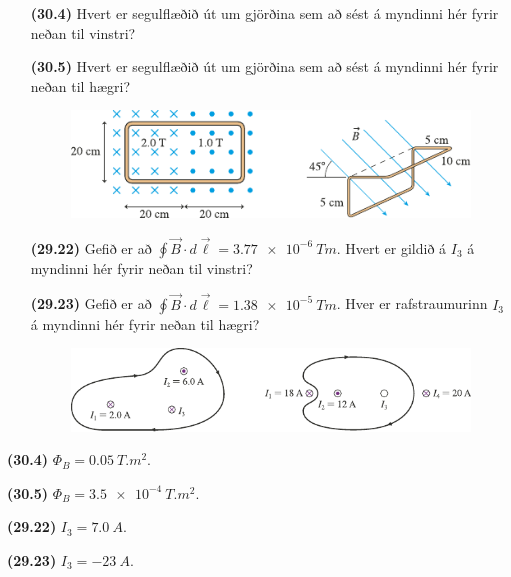 \begin{enumerate}[label = \textbf{(\alph*)}]

\item[\textbf{(30.4)}] Hvert er segulflæðið út um gjörðina sem að sést á myndinni hér fyrir neðan til vinstri?

\item[\textbf{(30.5)}]  Hvert er segulflæðið út um gjörðina sem að sést á myndinni hér fyrir neðan til hægri?

\begin{figure}[H]
    \centering
    \includegraphics{figures/rk304.pdf}
\end{figure}


\item[\textbf{(29.22)}] Gefið er að $\displaystyle \oint \vec{B} \cdot d\vec{\ell} = \SI{3.77e-6}{Tm}$. Hvert er gildið á $I_3$ á myndinni hér fyrir neðan til vinstri?

\item[\textbf{(29.23)}] Gefið er að $\displaystyle \oint \vec{B} \cdot d\vec{\ell} = \SI{1.38e-5}{Tm}$. Hver er rafstraumurinn $I_3$ á myndinni hér fyrir neðan til hægri?

\begin{figure}[H]
    \centering
    \includegraphics{figures/rk2922.pdf}
\end{figure}

\end{enumerate}


\begin{tcolorbox}
\begin{enumerate*}[label = ]
  \item \textbf{(30.4)} $\Phi_B = \SI{0.05}{T.m^2}$.
  \item \textbf{(30.5)} $\Phi_B = \SI{3.5e-4}{T.m^2}$.
  \item \textbf{(29.22)} $I_3 = \SI{7.0}{A}$.
  \item \textbf{(29.23)} $I_3 = - \SI{23}{A}$.
\end{enumerate*}
\end{tcolorbox}

